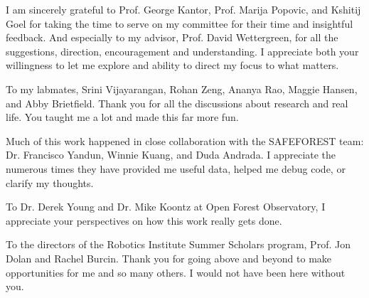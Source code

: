 
\setlength{\parskip}{1em}
\setlength{\parindent}{0em}

\noindent
I am sincerely grateful to Prof. George Kantor, Prof. Marija Popovic, and Kshitij Goel for taking the time to serve on my committee for their time and insightful feedback. And especially to my advisor, Prof. David Wettergreen, for all the suggestions, direction, encouragement and understanding. I appreciate both your willingness to let me explore and ability to direct my focus to what matters.

To my labmates, Srini Vijayarangan, Rohan Zeng, Ananya Rao, Maggie Hansen, and Abby Brietfield. Thank you for all the discussions about research and real life. You taught me a lot and made this far more fun.

Much of this work happened in close collaboration with the SAFEFOREST team: Dr. Francisco Yandun, Winnie Kuang, and Duda Andrada. I appreciate the numerous times they have provided me useful data, helped me debug code, or clarify my thoughts. 


To Dr. Derek Young and Dr. Mike Koontz at Open Forest Observatory, I appreciate your perspectives on how this work really gets done. 

To the directors of the Robotics Institute Summer Scholars program, Prof. Jon Dolan and Rachel Burcin. Thank you for going above and beyond to make opportunities for me and so many others. I would not have been here without you.
